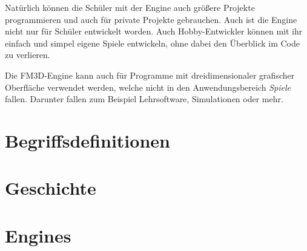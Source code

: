 Natürlich können die Schüler mit der Engine auch größere Projekte programmieren und auch für private Projekte gebrauchen. Auch ist die Engine nicht nur für Schüler entwickelt worden. Auch Hobby-Entwickler können mit ihr einfach und simpel eigene Spiele entwickeln, ohne dabei den Überblick im Code zu verlieren.

Die FM3D-Engine kann auch für Programme mit dreidimensionaler grafischer Oberfläche verwendet werden, welche nicht in den Anwendungsbereich \textit{Spiele} fallen. Darunter fallen zum Beispiel Lehrsoftware, Simulationen oder mehr.

\section{Begriffsdefinitionen}




\section{Geschichte}



\section{Engines}
\label{engines}


